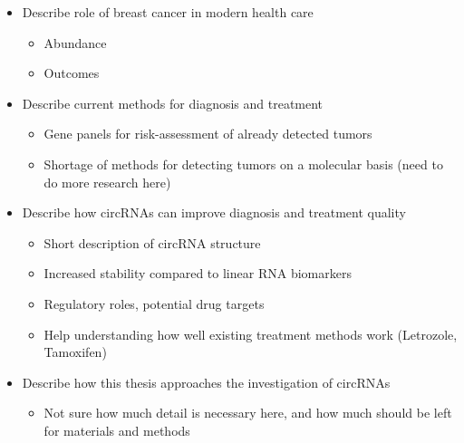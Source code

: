 \begin{itemize}
      \item Describe role of breast cancer in modern health care
            \begin{itemize}
                  \item Abundance
                  \item Outcomes
            \end{itemize}
      \item Describe current methods for diagnosis and treatment
            \begin{itemize}
                  \item Gene panels for risk-assessment of already detected
                        tumors
                  \item Shortage of methods for detecting tumors on a molecular
                        basis
                        (need to do more research here)
            \end{itemize}
      \item Describe how circRNAs can improve diagnosis and treatment quality
            \begin{itemize}
                  \item Short description of circRNA structure
                  \item Increased stability compared to linear RNA biomarkers
                  \item Regulatory roles, potential drug targets
                  \item Help understanding how well existing treatment methods
                        work
                        (Letrozole, Tamoxifen)
            \end{itemize}
      \item Describe how this thesis approaches the investigation of circRNAs
            \begin{itemize}
                  \item Not sure how much detail is necessary here, and how
                        much
                        should
                        be left for materials and methods
            \end{itemize}
\end{itemize}
